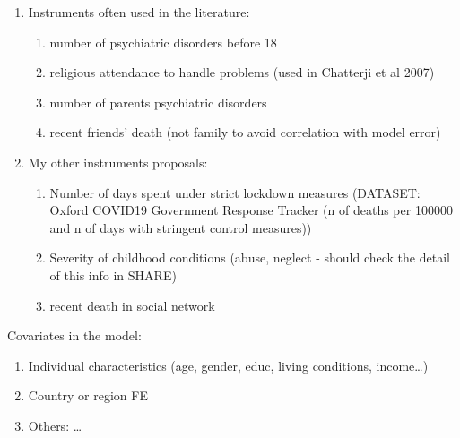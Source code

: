 \documentclass{article}
\begin{document}
\begin{enumerate}
    \item Instruments often used in the literature:
        \begin{enumerate}
            \item number of psychiatric disorders before 18
            \item religious attendance to handle problems (used in Chatterji et al 2007)
            \item number of parents psychiatric disorders 
            \item recent friends' death (not family to avoid correlation with model error)
        \end{enumerate}

    \item My other instruments proposals:
        \begin{enumerate}
            \item Number of days spent under strict lockdown measures (DATASET: Oxford COVID19 Government Response Tracker (n of deaths per 100000 and n of days with stringent control measures))
            \item Severity of childhood conditions (abuse, neglect - should check the detail of this info in SHARE)
            \item recent death in social network
        \end{enumerate}
\end{enumerate}
Covariates in the model: 
\begin{enumerate}
    \item Individual characteristics (age, gender, educ, living conditions, income\dots)
    \item Country or region FE
    \item Others: \dots
\end{enumerate}
\end{document}
